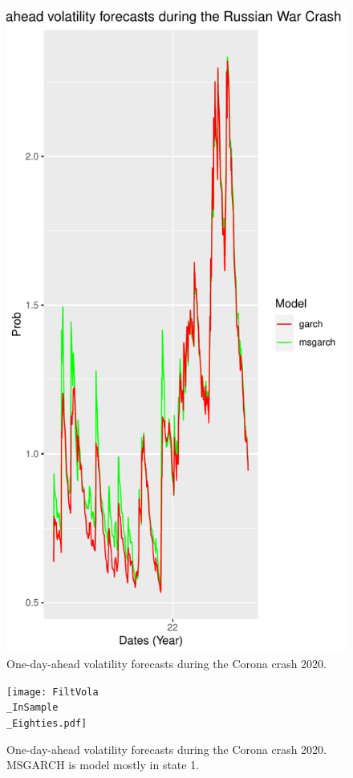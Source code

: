 \documentclass[11pt,a4paper]{article}
\begin{document}
\begin{figure}[h]
\includegraphics[width=1.2\linewidth]{pforecast-russia-crash.pdf}
\caption{One-day-ahead volatility forecasts during the Corona crash 2020.}
\end{figure}

\begin{figure}[h]
\texttt{[image: FiltVola\\\_InSample\\\_Eighties.pdf]}
\caption{One-day-ahead volatility forecasts during the Corona crash 2020. MSGARCH is model mostly in state 1.}
\end{figure}
\end{document}
